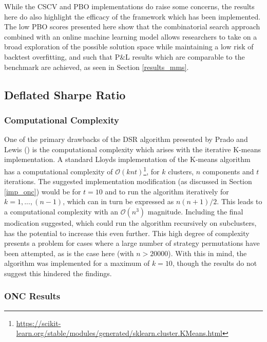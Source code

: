 \documentclass[a4paper,11pt,oneside]{article}
\theoremstyle{plain}
\theoremstyle{definition}
\begin{document}
	
	While the CSCV and PBO implementations do raise some concerns, the results here do also highlight the efficacy of the framework which has been implemented. The low PBO scores presented here show that the combinatorial search approach combined with an online machine learning model allows researchers to take on a broad exploration of the possible solution space while maintaining a low risk of backtest overfitting, and such that P\&L results which are comparable to the benchmark are achieved, as seen in Section \ref{results_mms}.
	
	\newpage

	\subsection{Deflated Sharpe Ratio}\label{results_dsr}	
	
	\subsubsection{Computational Complexity}
	
	One of the primary drawbacks of the DSR algorithm presented by Prado and Lewis (\cite{PradoDSR}) is the computational complexity which arises with the iterative K-means implementation. A standard Lloyds implementation of the K-means algorithm has a computational complexity of $\mathcal{O}(knt)$\footnote{\url{https://scikit-learn.org/stable/modules/generated/sklearn.cluster.KMeans.html}}, for $k$ clusters, $n$ components and $t$ iterations. The suggested implementation modification (as discussed in Section \ref{imp_onc}) would be for $t=10$ and to run the algorithm iteratively for $k=1,...,(n-1)$, which can in turn be expressed as $n(n+1)/2$. This leads to a computational complexity with an $\mathcal{O}(n^3)$ magnitude. Including the final modication suggested, which could run the algorithm recursively on subclusters, has the potential to increase this even further. This high degree of complexity presents a problem for cases where a large number of strategy permutations have been attempted, as is the case here (with $n> 20000$). With this in mind, the algorithm was implemented for a maximum of $k=10$, though the results do not suggest this hindered the findings.
	
	\subsubsection{ONC Results}\label{results_onc}
	
\end{document}
